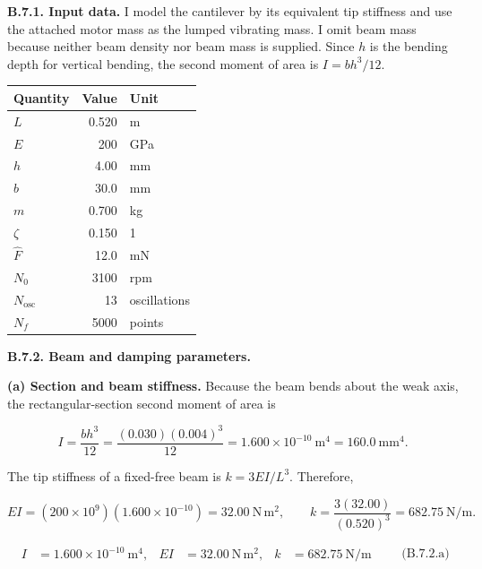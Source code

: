 \begingroup
\setlength{\abovedisplayskip}{6pt}
\setlength{\belowdisplayskip}{6pt}
\setlength{\abovedisplayshortskip}{4pt}
\setlength{\belowdisplayshortskip}{4pt}
\setlength{\intextsep}{6pt}

\textbf{B.7.1. Input data.} I model the cantilever by its equivalent tip stiffness and use the attached motor mass as the lumped vibrating mass. I omit beam mass because neither beam density nor beam mass is supplied. Since $h$ is the bending depth for vertical bending, the second moment of area is $I=bh^3/12$.

{ %
\begin{center}\small\begin{tabular}{@{}lrl@{}}
\toprule\noalign{}
Quantity & Value & Unit \\
\midrule\noalign{}
$L$ & 0.520 & m \\
$E$ & 200 & GPa \\
$h$ & 4.00 & mm \\
$b$ & 30.0 & mm \\
$m$ & 0.700 & kg \\
$\zeta$ & 0.150 & 1 \\
$\hat F$ & 12.0 & mN \\
$N_0$ & 3100 & rpm \\
$N_{\mathrm{osc}}$ & 13 & oscillations \\
$N_f$ & 5000 & points \\
\bottomrule\end{tabular}\end{center}
}

\textbf{B.7.2. Beam and damping parameters.}

\textbf{(a) Section and beam stiffness.} Because the beam bends about the weak axis, the rectangular-section second moment of area is

\[
I=\frac{bh^3}{12}
 =\frac{(0.030)(0.004)^3}{12}
 =1.600\times10^{-10}\ \mathrm{m^4}
 =160.0\ \mathrm{mm^4}.
\]

The tip stiffness of a fixed-free beam is $k=3EI/L^3$. Therefore,

\[
EI=(200\times10^9)(1.600\times10^{-10})
 =32.00\ \mathrm{N\,m^2},
\qquad
k=\frac{3(32.00)}{(0.520)^3}
 =682.75\ \mathrm{N/m}.
\]

\[
\boxed{
\begin{aligned}
I&=1.600\times10^{-10}\ \mathrm{m^4},&
EI&=32.00\ \mathrm{N\,m^2},&
k&=682.75\ \mathrm{N/m}
\end{aligned}}
\qquad\text{(B.7.2.a)}
\]

